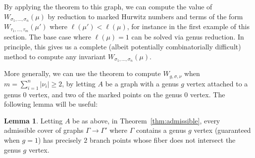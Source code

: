 \documentclass[11pt]{article}           %
\theoremstyle{definition}
\newtheorem{lem}{Lemma}[section]
\begin{document}

                By applying the theorem to this graph, we can compute the value of
                $W_{\sigma_1,\dots,\sigma_n}(\mu)$ by reduction to marked Hurwitz
                numbers and terms of the form
                $W_{\tau_1,\dots,\tau_m}(\mu')$ where $\ell(\mu')<\ell(\mu)$, for instance
                in the first example of this section.
                The base case where $\ell(\mu)=1$ can be solved via genus reduction.
                In principle, this gives us a complete (albeit potentially combinatorially difficult) method to compute any invariant $W_{\sigma_1,\dots,\sigma_n}(\mu)$.

                More generally, we can use the theorem to compute $W_{g,\sigma,\nu}$ when $m=\sum\limits_{i=1}^n|\nu_i|\geq 2$, by letting $A$ be a graph with a genus $g$ vertex attached to a genus $0$ vertex, and two of the
                marked points on the genus $0$ vertex. The following lemma will be useful:

                \begin{lem}
                  \label{lem:branchpoints}
                  Letting $A$ be as above, in Theorem~\ref{thm:admissible}, every admissible cover of graphs $\Gamma\to\Gamma'$ where $\Gamma$ contains a genus $g$ vertex (guaranteed when $g=1$) has precisely $2$ branch points
                  whose fiber does not intersect the genus $g$ vertex.
                \end{lem}
\end{document}
